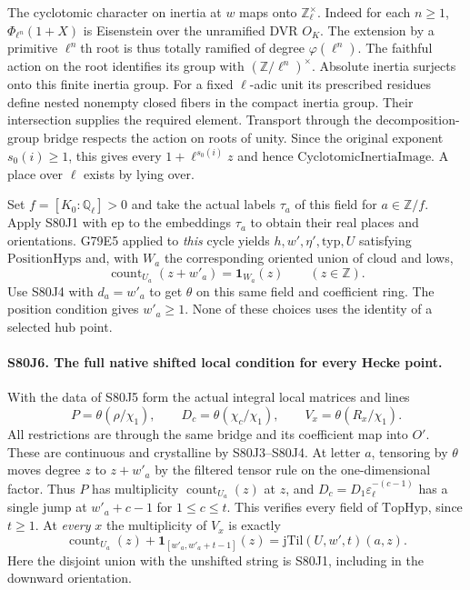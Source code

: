 The cyclotomic character on inertia at $w$ maps onto
$\mathbb Z_\ell^\times$. Indeed for each $n\ge1$,
$\Phi_{\ell^n}(1+X)$ is Eisenstein over the unramified DVR $O_K$.
The extension by a primitive $\ell^n$th root is thus totally
ramified of degree $\varphi(\ell^n)$. The faithful action on the
root identifies its group with $(\mathbb Z/\ell^n)^\times$.
Absolute inertia surjects onto this finite inertia group. For a
fixed $\ell$-adic unit its prescribed residues define nested
nonempty closed fibers in the compact inertia group. Their
intersection supplies the required element. Transport through
the decomposition-group bridge respects the action on roots of
unity. Since the original exponent $s_0(i)\ge1$, this gives every
$1+\ell^{s_0(i)}z$ and hence $\mathrm{CyclotomicInertiaImage}$.
A place over $\ell$ exists by lying over.

Set $f=[K_0:\mathbb Q_\ell]>0$ and take the actual labels
$\tau_a$ of this field for $a\in\mathbb Z/f$. Apply S80J1 with
$\mathrm{ep}$ to the embeddings $\tau_a$ to obtain their real
places and orientations. G79E5 applied to \emph{this} cycle yields
$h,w',\eta',\mathrm{typ},U$ satisfying $\mathrm{PositionHyps}$
and, with $W_a$ the corresponding oriented union of cloud and lows,
\[
                  \operatorname{count}_{U_a}(z+w'_a)=\mathbf1_{W_a}(z)
                       \qquad (z\in\mathbb Z).
\]
Use S80J4 with $d_a=w'_a$ to get $\theta$ on this same field and
coefficient ring. The position condition gives $w'_a\ge1$.
None of these choices uses the identity of a selected hub point.

\paragraph{S80J6. The full native shifted local condition for every Hecke point.}
With the data of S80J5 form the actual integral local matrices
and lines
\[
 P=\theta(\rho/\chi_1),\qquad D_c=\theta(\chi_c/\chi_1),
 \qquad V_x=\theta(R_x/\chi_1).
\]
All restrictions are through the same bridge and its coefficient
map into $O'$. These are continuous and crystalline by S80J3--S80J4.
At letter $a$, tensoring by $\theta$ moves degree $z$ to
$z+w'_a$ by the filtered tensor rule on the one-dimensional factor.
Thus $P$ has multiplicity $\operatorname{count}_{U_a}(z)$ at $z$,
and $D_c=D_1\varepsilon_\ell^{-(c-1)}$ has a single jump at
$w'_a+c-1$ for $1\le c\le t$. This verifies every field of
$\mathrm{TopHyp}$, since $t\ge1$. At \emph{every} $x$ the
multiplicity of $V_x$ is exactly
\[
       \operatorname{count}_{U_a}(z)
              +\mathbf1_{[w'_a,w'_a+t-1]}(z)
                =\mathrm{jTil}(U,w',t)(a,z).
\]
Here the disjoint union with the unshifted string is S80J1,
including in the downward orientation.

